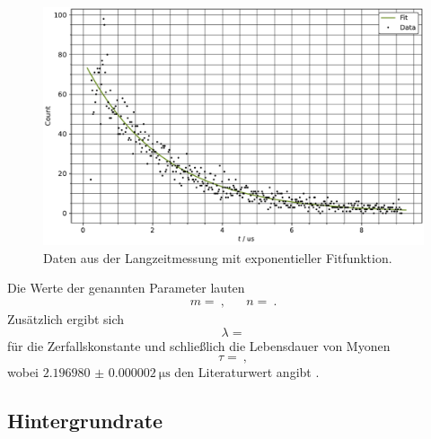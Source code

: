 \begin{figure}[H]
	\centering
	\includegraphics[width=\textwidth]{build/lifetime.pdf}
	\caption{Daten aus der Langzeitmessung mit exponentieller Fitfunktion.}
	\label{fig:lifetime}
	\vspace{-\baselineskip}
\end{figure}

Die Werte der genannten Parameter lauten
\begin{align*}
	m =  \: , && n =  \: .
\end{align*}
Zusätzlich ergibt sich
\begin{equation*}
	\lambda = 
\end{equation*}
für die Zerfallskonstante und schließlich die Lebensdauer von Myonen
\begin{equation*}
	\tau =  \: ,
\end{equation*}
wobei $\qty{2.196980(2)}{\micro\second}$ den Literaturwert angibt \cite{Tishchenko_2013}.



\subsection{Hintergrundrate}

